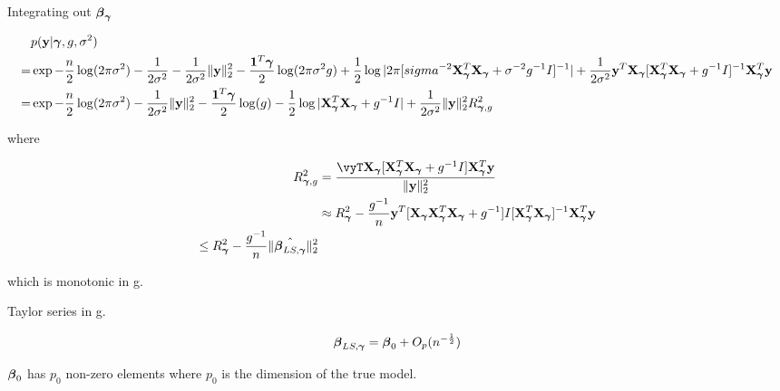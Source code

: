 \documentclass{amsart}
\begin{document}
Integrating out ${\boldsymbol \beta}_{\boldsymbol \gamma}$

\begin{align*}
&p({\bf y} | {\boldsymbol \gamma}, g, \sigma^2) \\
=& \exp{-\frac{n}{2} \log(2 \pi \sigma^2) - \frac{1}{2 \sigma^2} - \frac{1}{2 \sigma^2} \|{\bf y}\|_2^2
				-\frac{{\bf1}^T {\boldsymbol\gamma}}{2} \log(2 \pi \sigma^2 g)
				+ \frac{1}{2} \log |2 \pi [sigma^{-2} {\bf X}_{\boldsymbol\gamma}^T {\bf X}_{\boldsymbol\gamma}+ \sigma^{-2} g^{-1} I]^{-1}|
				+ \frac{1}{2 \sigma^2} {\bf y}^T {\bf X}_{\boldsymbol\gamma}[{\bf X}_{\boldsymbol\gamma}^T {\bf X}_{\boldsymbol\gamma}+ g^{-1} I]^{-1} {\bf X}_{\boldsymbol\gamma}^T {\bf y}} \\
=& \exp{-\frac{n}{2} \log(2 \pi \sigma^2) - \frac{1}{2 \sigma^2} \|{\bf y}\|_2^2 - \frac{{\bf1}^T {\boldsymbol\gamma}}{2} \log(g)
				-\frac{1}{2} \log|{\bf X}_{\boldsymbol\gamma}^T {\bf X}_{\boldsymbol\gamma}+ g^{-1}I| + \frac{1}{2 \sigma^2} \|{\bf y}\|_2^2 R_{{\boldsymbol\gamma}, g}^2}
\end{align*}

where

\begin{align*}
R_{\vgamma, g}^2 &= \frac{\vyT \mX_\vgamma [\mX_\vgamma^T \mX_\vgamma + g^{-1} I] \mX_\vgamma^T \vy}{\|\vy\|_2^2} \\
&\approx R_\vgamma^2 - \frac{g^{-1}}{n} \vy^T [\mX_\vgamma \mX_\vgamma^T \mX_\vgamma + g^{-1}] I [\mX_\vgamma^T \mX_\vgamma]^{-1} \mX_\vgamma^T \vy \\
\leq R_\vgamma^2 - \frac{g^{-1}}{n} \| \hat{\vbeta_{LS, \vgamma}} \|_2^2
\end{align*}

which is monotonic in g.

Taylor series \expansion in g.

\begin{equation*}
{\boldsymbol\beta}_{LS, {\boldsymbol \gamma}} = {\boldsymbol \beta}_0 + O_p(n^{-\frac{1}{2}})
\end{equation*}

${\boldsymbol \beta}_0$ has $p_0$ non-zero elements where $p_0$ is the dimension of the true model.
\end{document}
